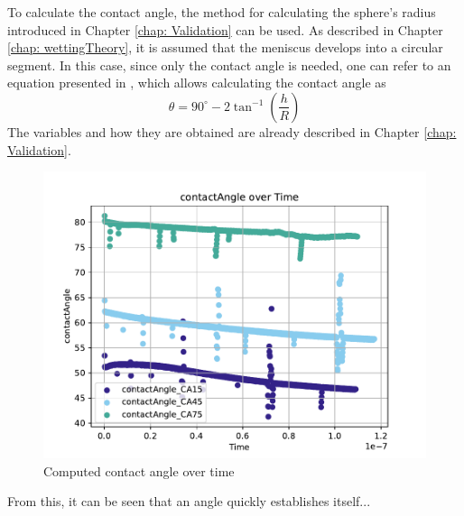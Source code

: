 To calculate the contact angle, the method for calculating the sphere's radius introduced in Chapter \ref*{chap: Validation} can be used. As described in Chapter \ref*{chap: wettingTheory}, it is assumed that the meniscus develops into a circular segment. In this case, since only the contact angle is needed, one can refer to an equation presented in \cite{buttPhysicsChemistryInterfaces}, which allows calculating the contact angle as
\begin{equation}
    \theta = 90^{\circ}- 2\tan^{-1}\left(\frac{h}{R}\right) 
\end{equation}
The variables and how they are obtained are already described in Chapter \ref*{chap: Validation}. 
\begin{figure}[h]
    \centering
    \includegraphics[width=.95\textwidth]{Pictures/contactAngle_overTime.pdf}
    \caption{Computed contact angle over time}
    \label{fig: CA_overTime}
\end{figure}
From this, it can be seen that an angle quickly establishes itself... 
